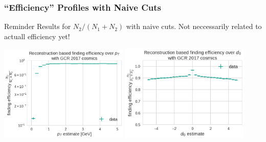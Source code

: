 \documentclass[18pt]{beamer}
\begin{document}
  \begin{frame}
    \frametitle{``Efficiency'' Profiles with Naive Cuts}
    \begin{alertblock}{Reminder}
      Results for $N_2 / (N_1 + N_2)$ with naive cuts. Not neccessarily related to actuall efficiency yet!
    \end{alertblock}
    \begin{center}
      \includegraphics[width=0.46\textwidth]{figures/findeff_pt_data.png}
      \includegraphics[width=0.46\textwidth]{figures/findeff_d0_data.png}
    \end{center}
  \end{frame}
\end{document}

